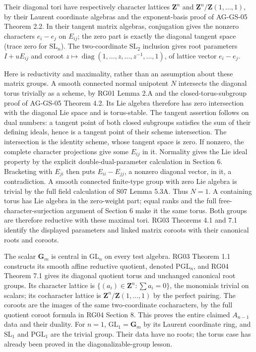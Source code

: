 \documentclass[11pt,a4paper,openany]{report}
\begin{document}
Their diagonal tori have respectively character lattices \(\mathbf Z^n\) and \(\mathbf Z^n/\mathbf Z(1,\ldots,1)\), by their Laurent coordinate algebras and the exponent-basis proof of AG-GS-05 Theorem 2.2. In their tangent matrix algebras, conjugation gives the nonzero characters \(e_i-e_j\) on \(E_{ij}\); the zero part is exactly the diagonal tangent space (trace zero for \(\mathrm{SL}_n\)). The two-coordinate \(\mathrm{SL}_2\) inclusion gives root parameters \(I+uE_{ij}\) and coroot \(z\mapsto\operatorname{diag}(1,\ldots,z,\ldots,z^{-1},\ldots,1)\), of lattice vector \(e_i-e_j\).

Here is reductivity and maximality, rather than an assumption about these matrix groups. A smooth connected normal unipotent \(N\) intersects the diagonal torus trivially as a scheme, by RG01 Lemma 2.A and the closed-torus-subgroup proof of AG-GS-05 Theorem 4.2. Its Lie algebra therefore has zero intersection with the diagonal Lie space and is torus-stable. The tangent assertion follows on dual numbers: a tangent point of both closed subgroups satisfies the sum of their defining ideals, hence is a tangent point of their scheme intersection. The intersection is the identity scheme, whose tangent space is zero. If nonzero, the complete character projections give some \(E_{ij}\) in it. Normality gives the Lie ideal property by the explicit double-dual-parameter calculation in Section 6. Bracketing with \(E_{ji}\) then puts \(E_{ii}-E_{jj}\), a nonzero diagonal vector, in it, a contradiction. A smooth connected finite-type group with zero Lie algebra is trivial by the full field calculation of S07 Lemma 5.3A. Thus \(N=1\). A containing torus has Lie algebra in the zero-weight part; equal ranks and the full free-character-surjection argument of Section 6 make it the same torus. Both groups are therefore reductive with these maximal tori. RG03 Theorems 4.1 and 7.1 identify the displayed parameters and linked matrix coroots with their canonical roots and coroots.

The scalar \(\mathbf G_m\) is central in \(\mathrm{GL}_n\) on every test algebra. RG03 Theorem 1.1 constructs its smooth affine reductive quotient, denoted \(\mathrm{PGL}_n\), and RG04 Theorem 7.1 gives its diagonal quotient torus and unchanged canonical root groups. Its character lattice is \(\{(a_i)\in\mathbf Z^n:\sum a_i=0\}\), the monomials trivial on scalars; its cocharacter lattice is \(\mathbf Z^n/\mathbf Z(1,\ldots,1)\) by the perfect pairing. The coroots are the images of the same two-coordinate cocharacters, by the full quotient coroot formula in RG04 Section 8. This proves the entire claimed \(A_{n-1}\) data and their duality. For \(n=1\), \(\mathrm{GL}_1=\mathbf G_m\) by its Laurent coordinate ring, and \(\mathrm{SL}_1\) and \(\mathrm{PGL}_1\) are the trivial group. Their data have no roots; the torus case has already been proved in the diagonalizable-group lesson.
\end{document}
